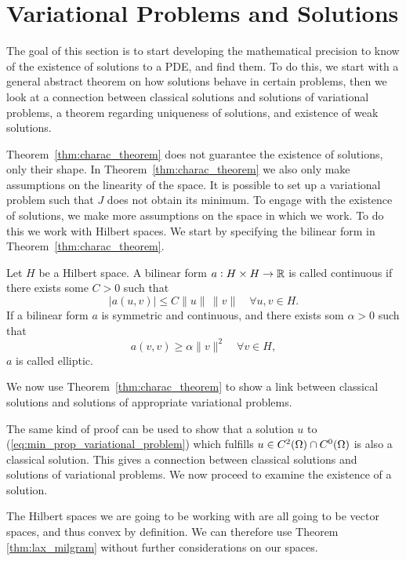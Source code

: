 \section{Variational Problems and Solutions}
The goal of this section is to start developing the mathematical 
precision to know of the existence of solutions to a PDE, and find 
them. 
To do this, we start with a general abstract theorem on how solutions 
behave in certain problems, then we look at a connection between 
classical solutions and solutions of variational problems, a 
theorem regarding uniqueness of solutions, and existence of 
weak solutions.


Theorem~\ref{thm:charac_theorem} does not guarantee the existence 
of solutions, only their shape. In Theorem~\ref{thm:charac_theorem} we 
also only make assumptions on the linearity of the space. 
It is possible to set up a variational problem such that $J$ does 
not obtain its minimum.
To engage with the existence of solutions, we make more assumptions on 
the space in which we work. To do this we work with Hilbert spaces. 
We start by specifying the bilinear form in Theorem~\ref{thm:charac_theorem}.
\begin{defn}{\quad}
   Let $H$ be a Hilbert space. A bilinear form $a : H \times H \to \mathbb{R}$ is 
   called continuous if there exists some $C > 0$ such that 
   \begin{equation}
    |a(u,v)| \leq C \|u\|\, \|v\| \quad \forall u,v \in H.
   \end{equation} 
   If a bilinear form $a$ is symmetric and continuous, and there exists som $\alpha >0$ such that 
   \begin{equation*}
    a(v,v) \geq \alpha \|v\|^2 \quad \forall v \in H,
   \end{equation*}
   $a$ is called elliptic.
 \end{defn}
We now use Theorem~\ref{thm:charac_theorem} to show a link between classical 
solutions and solutions of appropriate variational problems.

The same kind of proof can be used to show that a solution $u$ to 
(\ref{eq:min_prop_variational_problem}) which fulfills 
$u\in C^2(\Omega) \cap C^0(\Omega)$ is also a classical solution. 
This gives a connection between classical solutions and solutions of 
variational problems. We now proceed to examine the existence of a 
solution.

The Hilbert spaces we are going to be working with are all going to be 
vector spaces, and thus convex by definition. 
We can therefore use Theorem \ref{thm:lax_milgram} without further considerations 
on our spaces.

